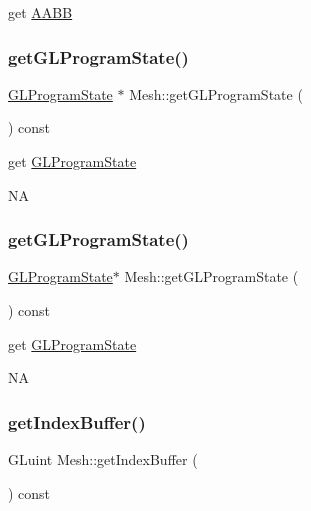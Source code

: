 get \hyperlink{classAABB}{A\+A\+BB} \mbox{\label{classMesh_ae522c9730cd764069561f1ce2e15f587}} 
\subsubsection{\texorpdfstring{get\+G\+L\+Program\+State()}{getGLProgramState()}\hspace{0.1cm}{\footnotesize\ttfamily [1/2]}}
{\footnotesize\ttfamily \hyperlink{classGLProgramState}{G\+L\+Program\+State} $\ast$ Mesh\+::get\+G\+L\+Program\+State (\begin{DoxyParamCaption}{ }\end{DoxyParamCaption}) const}

get \hyperlink{classGLProgramState}{G\+L\+Program\+State}

NA \mbox{\label{classMesh_a146c364e9ac9e83dc1b59a07d2c47653}} 
\subsubsection{\texorpdfstring{get\+G\+L\+Program\+State()}{getGLProgramState()}\hspace{0.1cm}{\footnotesize\ttfamily [2/2]}}
{\footnotesize\ttfamily \hyperlink{classGLProgramState}{G\+L\+Program\+State}$\ast$ Mesh\+::get\+G\+L\+Program\+State (\begin{DoxyParamCaption}{ }\end{DoxyParamCaption}) const}

get \hyperlink{classGLProgramState}{G\+L\+Program\+State}

NA \mbox{\label{classMesh_a2b30616b2101f88ffdbef2720538f9d6}} 
\subsubsection{\texorpdfstring{get\+Index\+Buffer()}{getIndexBuffer()}\hspace{0.1cm}{\footnotesize\ttfamily [1/2]}}
{\footnotesize\ttfamily G\+Luint Mesh\+::get\+Index\+Buffer (\begin{DoxyParamCaption}{ }\end{DoxyParamCaption}) const}


